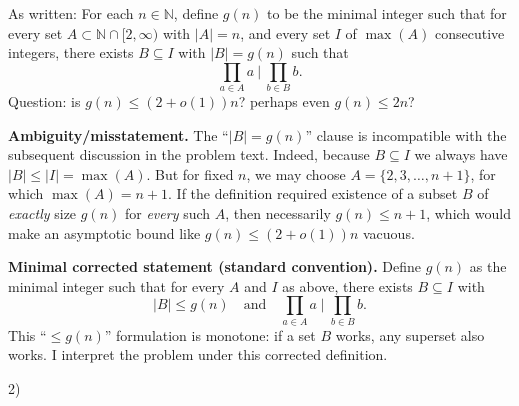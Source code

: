 As written:
For each $n\in\mathbb{N}$, define $g(n)$ to be the minimal integer such that for every set $A\subset\mathbb{N}\cap[2,\infty)$ with $|A|=n$, and every set $I$ of $\max(A)$ consecutive integers, there exists $B\subseteq I$ with $|B|=g(n)$ such that
\[
\prod_{a\in A} a\ \big|\ \prod_{b\in B} b.
\]
Question: is $g(n)\le (2+o(1))n$? perhaps even $g(n)\le 2n$?

\textbf{Ambiguity/misstatement.}
The ``$|B|=g(n)$'' clause is incompatible with the subsequent discussion in the problem text.
Indeed, because $B\subseteq I$ we always have $|B|\le |I|=\max(A)$.
But for fixed $n$, we may choose $A=\{2,3,\dots,n+1\}$, for which $\max(A)=n+1$.
If the definition required existence of a subset $B$ of \emph{exactly} size $g(n)$ for \emph{every} such $A$, then necessarily $g(n)\le n+1$, which would make an asymptotic bound like $g(n)\le (2+o(1))n$ vacuous.

\textbf{Minimal corrected statement (standard convention).}
Define $g(n)$ as the minimal integer such that for every $A$ and $I$ as above, there exists $B\subseteq I$ with
\[
|B|\le g(n)\quad\text{and}\quad \prod_{a\in A} a\mid \prod_{b\in B} b.
\]
This ``$\le g(n)$'' formulation is monotone: if a set $B$ works, any superset also works.
I interpret the problem under this corrected definition.

2)
